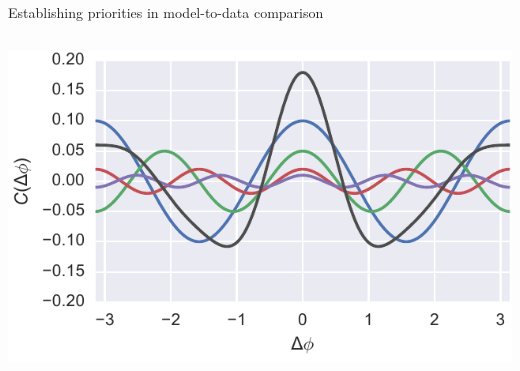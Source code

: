 \documentclass[aspectratio=43]{beamer}
\theoremstyle{definition}
\begin{document}
\begin{frame}{Establishing priorities in model-to-data comparison}
\begin{columns}
\begin{column}{.5\textwidth}
      \includegraphics[width=\textwidth]{harmonics}
    \end{column}
  \end{columns}
\end{frame}
\end{document}
